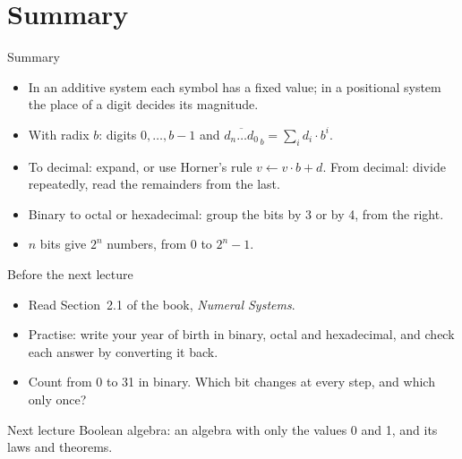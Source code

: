 \documentclass[10pt]{wosm-slides}
\begin{document}
\section{Summary}

\begin{frame}{Summary}
  \begin{itemize}
    \item In an additive system each symbol has a fixed value; in a positional
      system the place of a digit decides its magnitude.
    \item With radix $b$: digits $0, \dots, b - 1$ and
      $\overline{d_n \dots d_0}_{\,b} = \sum_i d_i \cdot b^i$.
    \item To decimal: expand, or use Horner's rule $v \leftarrow v \cdot b + d$.
      From decimal: divide repeatedly, read the remainders from the last.
    \item Binary to octal or hexadecimal: group the bits by 3 or by 4, from the
      right.
    \item $n$ bits give $2^n$ numbers, from $0$ to $2^n - 1$.
  \end{itemize}
\end{frame}

\begin{frame}{Before the next lecture}
  \begin{itemize}
    \item Read Section~2.1 of the book, \emph{Numeral Systems}.
    \item Practise: write your year of birth in binary, octal and hexadecimal, and
      check each answer by converting it back.
    \item Count from 0 to 31 in binary. Which bit changes at every step, and which
      only once?
  \end{itemize}

  \begin{block}{Next lecture }
    Boolean algebra: an algebra with only the values 0 and 1, and its laws and
    theorems.
  \end{block}
\end{frame}
\end{document}
